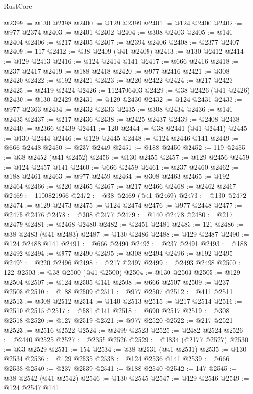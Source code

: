 \begin{lexlean}{RustCore}
\begin{coremodule}
@2399 := @130 @2398
@2400 := @129 @2399
@2401 := @124 @2400
@2402 := @977 @2374
@2403 := @2401 @2402
@2404 := @308 @2403
@2405 := @140 @2404
@2406 := @217 @2405
@2407 := @2394 @2406
@2408 := @2377 @2407
@2409 := 117
@2412 := @38 @2409 (@41 @2409)
@2413 := @130 @2412
@2414 := @129 @2413
@2416 := @124 @2414 @141
@2417 := @666 @2416
@2418 := @237 @2417
@2419 := @188 @2418
@2420 := @977 @2416
@2421 := @308 @2420
@2422 := @192 @2421
@2423 := @220 @2422
@2424 := @217 @2423
@2425 := @2419 @2424
@2426 := 1124706403
@2429 := @38 @2426 (@41 @2426)
@2430 := @130 @2429
@2431 := @129 @2430
@2432 := @124 @2431
@2433 := @977 @2363
@2434 := @2432 @2433
@2435 := @308 @2434
@2436 := @140 @2435
@2437 := @217 @2436
@2438 := @2425 @2437
@2439 := @2408 @2438
@2440 := @2366 @2439
@2441 := 120
@2444 := @38 @2441 (@41 @2441)
@2445 := @130 @2444
@2446 := @129 @2445
@2448 := @124 @2446 @141
@2449 := @666 @2448
@2450 := @237 @2449
@2451 := @188 @2450
@2452 := 119
@2455 := @38 @2452 (@41 @2452)
@2456 := @130 @2455
@2457 := @129 @2456
@2459 := @124 @2457 @141
@2460 := @666 @2459
@2461 := @237 @2460
@2462 := @188 @2461
@2463 := @977 @2459
@2464 := @308 @2463
@2465 := @192 @2464
@2466 := @220 @2465
@2467 := @217 @2466
@2468 := @2462 @2467
@2469 := 1100821966
@2472 := @38 @2469 (@41 @2469)
@2473 := @130 @2472
@2474 := @129 @2473
@2475 := @124 @2474
@2476 := @977 @2448
@2477 := @2475 @2476
@2478 := @308 @2477
@2479 := @140 @2478
@2480 := @217 @2479
@2481 := @2468 @2480
@2482 := @2451 @2481
@2483 := 121
@2486 := @38 @2483 (@41 @2483)
@2487 := @130 @2486
@2488 := @129 @2487
@2490 := @124 @2488 @141
@2491 := @666 @2490
@2492 := @237 @2491
@2493 := @188 @2492
@2494 := @977 @2490
@2495 := @308 @2494
@2496 := @192 @2495
@2497 := @220 @2496
@2498 := @217 @2497
@2499 := @2493 @2498
@2500 := 122
@2503 := @38 @2500 (@41 @2500)
@2504 := @130 @2503
@2505 := @129 @2504
@2507 := @124 @2505 @141
@2508 := @666 @2507
@2509 := @237 @2508
@2510 := @188 @2509
@2511 := @977 @2507
@2512 := @411 @2511
@2513 := @308 @2512
@2514 := @140 @2513
@2515 := @217 @2514
@2516 := @2510 @2515
@2517 := @581 @141
@2518 := @690 @2517
@2519 := @308 @2518
@2520 := @127 @2519
@2521 := @977 @2520
@2522 := @217 @2521
@2523 := @2516 @2522
@2524 := @2499 @2523
@2525 := @2482 @2524
@2526 := @2440 @2525
@2527 := @2355 @2526
@2529 := @1834 (@2177 @2527)
@2530 := @33 @2529
@2531 := 154
@2534 := @38 @2531 (@41 @2531)
@2535 := @130 @2534
@2536 := @129 @2535
@2538 := @124 @2536 @141
@2539 := @666 @2538
@2540 := @237 @2539
@2541 := @188 @2540
@2542 := 147
@2545 := @38 @2542 (@41 @2542)
@2546 := @130 @2545
@2547 := @129 @2546
@2549 := @124 @2547 @141

\end{coremodule}
\end{lexlean}
